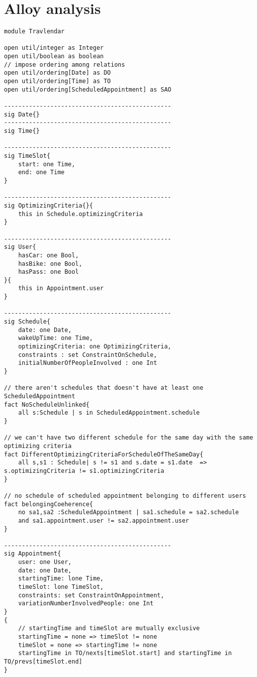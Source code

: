 \chapter{Alloy analysis}

\begin{lstlisting}
module Travlendar

open util/integer as Integer
open util/boolean as boolean
// impose ordering among relations
open util/ordering[Date] as DO 
open util/ordering[Time] as TO
open util/ordering[ScheduledAppointment] as SAO

-----------------------------------------------
sig Date{}
-----------------------------------------------
sig Time{}

-----------------------------------------------
sig TimeSlot{
	start: one Time,
	end: one Time
}

-----------------------------------------------
sig OptimizingCriteria{}{
	this in Schedule.optimizingCriteria
}

-----------------------------------------------
sig User{
	hasCar: one Bool,
	hasBike: one Bool,
	hasPass: one Bool
}{
	this in Appointment.user
}

-----------------------------------------------
sig Schedule{
	date: one Date,
	wakeUpTime: one Time,
	optimizingCriteria: one OptimizingCriteria,
	constraints : set ConstraintOnSchedule,
	initialNumberOfPeopleInvolved : one Int
}

// there aren't schedules that doesn't have at least one ScheduledAppointment
fact NoScheduleUnlinked{
	all s:Schedule | s in ScheduledAppointment.schedule  
}

// we can't have two different schedule for the same day with the same optimizing criteria
fact DifferentOptimizingCriteriaForScheduleOfTheSameDay{
	all s,s1 : Schedule| s != s1 and s.date = s1.date  => s.optimizingCriteria != s1.optimizingCriteria 
}

// no schedule of scheduled appointment belonging to different users
fact belongingCoeherence{
	no sa1,sa2 :ScheduledAppointment | sa1.schedule = sa2.schedule 
	and sa1.appointment.user != sa2.appointment.user
}

-----------------------------------------------
sig Appointment{
	user: one User,
	date: one Date,
	startingTime: lone Time,
	timeSlot: lone TimeSlot,
	constraints: set ConstraintOnAppointment,
	variationNumberInvolvedPeople: one Int
}
{	
	// startingTime and timeSlot are mutually exclusive
	startingTime = none => timeSlot != none
	timeSlot = none => startingTime != none
	startingTime in TO/nexts[timeSlot.start] and startingTime in TO/prevs[timeSlot.end]
}


\end{lstlisting}
